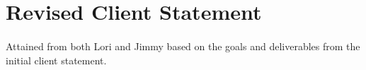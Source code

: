\section{Revised Client Statement}
    \paragraph{}
        \TODO
            Attained from both Lori and Jimmy based on the goals and deliverables from the initial client statement.